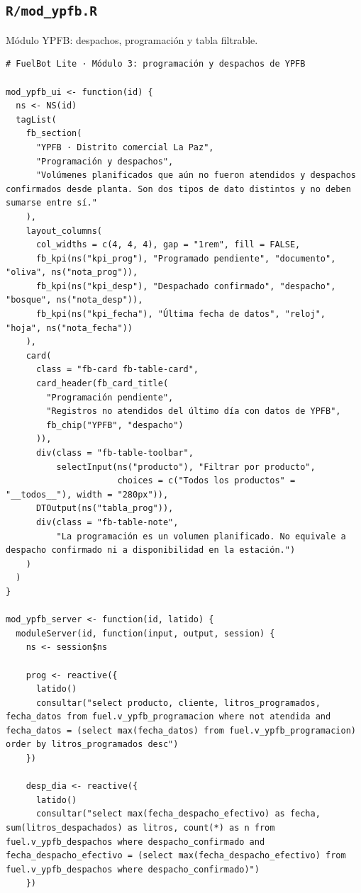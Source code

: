 \subsection{\texttt{R/mod\_ypfb.R}}
Módulo YPFB: despachos, programación y tabla filtrable.
\begin{lstlisting}[style=anexoR]
# FuelBot Lite · Módulo 3: programación y despachos de YPFB

mod_ypfb_ui <- function(id) {
  ns <- NS(id)
  tagList(
    fb_section(
      "YPFB · Distrito comercial La Paz",
      "Programación y despachos",
      "Volúmenes planificados que aún no fueron atendidos y despachos confirmados desde planta. Son dos tipos de dato distintos y no deben sumarse entre sí."
    ),
    layout_columns(
      col_widths = c(4, 4, 4), gap = "1rem", fill = FALSE,
      fb_kpi(ns("kpi_prog"), "Programado pendiente", "documento", "oliva", ns("nota_prog")),
      fb_kpi(ns("kpi_desp"), "Despachado confirmado", "despacho", "bosque", ns("nota_desp")),
      fb_kpi(ns("kpi_fecha"), "Última fecha de datos", "reloj", "hoja", ns("nota_fecha"))
    ),
    card(
      class = "fb-card fb-table-card",
      card_header(fb_card_title(
        "Programación pendiente",
        "Registros no atendidos del último día con datos de YPFB",
        fb_chip("YPFB", "despacho")
      )),
      div(class = "fb-table-toolbar",
          selectInput(ns("producto"), "Filtrar por producto",
                      choices = c("Todos los productos" = "__todos__"), width = "280px")),
      DTOutput(ns("tabla_prog")),
      div(class = "fb-table-note",
          "La programación es un volumen planificado. No equivale a despacho confirmado ni a disponibilidad en la estación.")
    )
  )
}

mod_ypfb_server <- function(id, latido) {
  moduleServer(id, function(input, output, session) {
    ns <- session$ns

    prog <- reactive({
      latido()
      consultar("select producto, cliente, litros_programados, fecha_datos from fuel.v_ypfb_programacion where not atendida and fecha_datos = (select max(fecha_datos) from fuel.v_ypfb_programacion) order by litros_programados desc")
    })

    desp_dia <- reactive({
      latido()
      consultar("select max(fecha_despacho_efectivo) as fecha, sum(litros_despachados) as litros, count(*) as n from fuel.v_ypfb_despachos where despacho_confirmado and fecha_despacho_efectivo = (select max(fecha_despacho_efectivo) from fuel.v_ypfb_despachos where despacho_confirmado)")
    })


\end{lstlisting}
